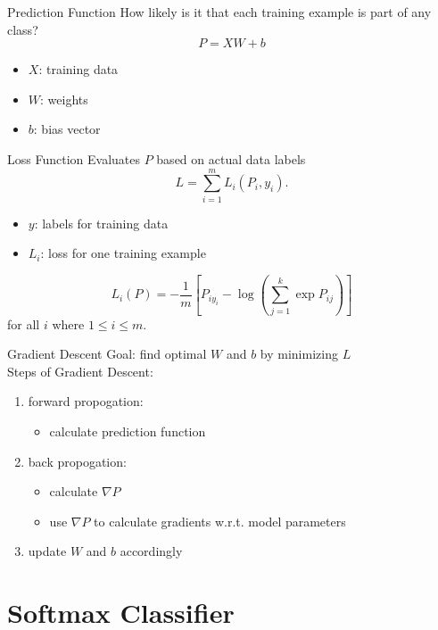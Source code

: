 \documentclass{beamer}
\begin{document}
  \begin{frame}{Prediction Function}
    How likely is it that each training example is part of any class?
    $$ P = XW + b $$
    \begin{itemize}
      \item $X$: training data
      \item $W$: weights
      \item $b$: bias vector
    \end{itemize}
  \end{frame}

  \begin{frame}{Loss Function}
    Evaluates $P$ based on actual data labels
    $$ L = \sum_{i=1}^m L_i(P_i, y_i). $$
    \begin{itemize}
      \item $y$: labels for training data
      \item $L_i$: loss for one training example
    \end{itemize}
    $$ L_i(P) = -\frac{1}{m} \left[ P_{iy_i} - \log\left( \sum_{j=1}^k \exp
    P_{ij} \right)\right] $$ for all $i$ where $1 \leq i \leq m$.
  \end{frame}

  \begin{frame}{Gradient Descent}
    Goal: find optimal $W$ and $b$ by minimizing $L$\\
    Steps of Gradient Descent:
    \begin{enumerate}
      \item forward propogation: \begin{itemize}
        \item calculate prediction function
      \end{itemize}
      \item back propogation: \begin{itemize}
        \item calculate $\nabla P$
        \item use $\nabla P$ to calculate gradients w.r.t. model parameters
      \end{itemize}
      \item update $W$ and $b$ accordingly
    \end{enumerate}
  \end{frame}

  \section{Softmax Classifier}
\end{document}
